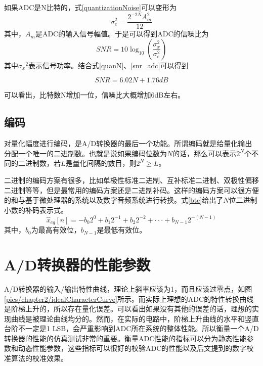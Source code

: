 	如果ADC是N比特的，式\ref{quantizationNoise}可以变形为
		\begin{equation}
			\sigma _e^2 = \frac{{{2^{ - 2N}}A_m^2}}{{12}} \label{quanN}
		\end{equation}
	其中，$A_m$是ADC的输入信号幅值。于是可以得到ADC的信噪比为
		\begin{equation}
			SNR = 10{\log _{10}}(\frac{{\sigma _x^2}}{{\sigma _e^2}}) \label{snr_adc}
		\end{equation}
	其中${\sigma _x}^2$表示信号功率。结合式\ref{quanN}、\ref{snr_adc}可以得到
	
	$$SNR = 6.02N + 1.76dB$$
	
	可以看出，比特数N增加一位，信噪比大概增加6dB左右。
	
	
	
	\subsection {编码}
	对量化幅度进行编码，是A/D转换器的最后一个功能。所谓编码就是给量化输出分配一个唯一的二进制数。也就是说如果编码位数为$N$的话，那么可以表示$2^N$个不同的二进制数，若$L$是量化间隔的数目，则${2^N} \ge L$。\par
	二进制的编码方案有很多，比如单极性标准二进制、互补标准二进制、双极性偏移二进制等等，但是最常用的编码方案还是二进制补码。这样的编码方案可以很方便的和与基于微处理器的系统以及数字音频系统进行转换。式\ref{btc}给出了$N$位二进制小数的补码表示式。
		\begin{equation}
			{\hat x_{eq}}[n] =  - {b_0}{2^0} + {b_1}{2^{ - 1}} + {b_2}{2^{ - 2}} +  \cdot  \cdot  \cdot  + {b_{N - 1}}{2^{ - (N - 1)}} \label{btc}
		\end{equation}
	其中，$b_0$为最高有效位，$b_{N-1}$是最低有效位。
\section{A/D转换器的性能参数}

	A/D转换器的输入/输出特性曲线，理论上斜率应该为1，而且应该过零点，如图\ref{pics/chapter2/idealCharacterCurve}所示。而实际上理想的ADC的特性转换曲线是阶梯上升的，所以存在量化误差。可以看出如果没有其他的误差的话，理想的实现曲线是被理论曲线均分的。然而，在实际的电路中，阶梯上升曲线的水平和竖直台阶不一定是1 LSB，会严重影响到ADC所在系统的整体性能。所以衡量一个A/D转换器的性能的仿真测试非常的重要。衡量ADC性能的指标可以分为静态性能参数和动态性能参数，这些指标可以很好的校验ADC的性能以及后文提到的数字校准算法的校准效果。

